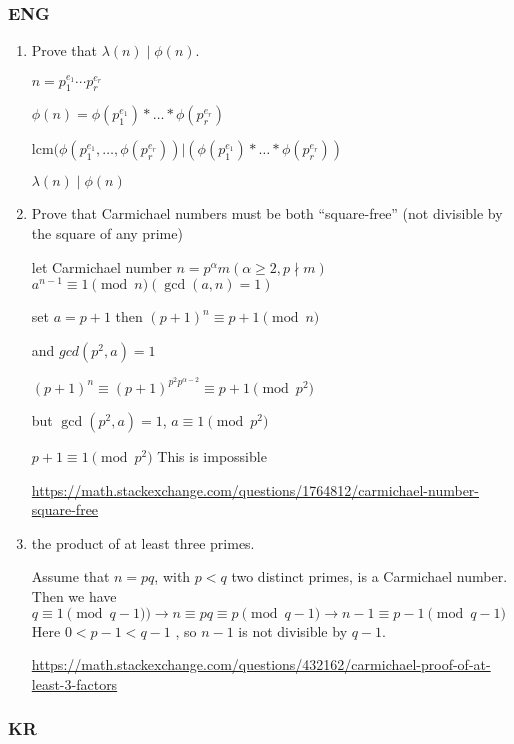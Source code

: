 \subsubsection{ENG}

\begin{enumerate}
    \item  Prove that $\lambda(n) \mid \phi(n)$.
    
    $n = p_1^{e_1} \cdots p_r^{e_r}$

    $ \phi(n) = \phi(p_1^{e_1})* \ldots*\phi(p_r^{e_r})$

    $\text{lcm}(\phi(p_1^{e_1}, \ldots, \phi(p_r^{e_r})) | (\phi(p_1^{e_1})* \ldots*\phi(p_r^{e_r}))$
    
    $\lambda(n) \mid \phi(n)$

    \item  Prove that Carmichael numbers must be both “square-free” (not divisible by the square of any prime) 

    let Carmichael number $n = p^\alpha m( \alpha \ge 2 ,  p \nmid m )$
    $a^{n-1} \equiv 1 \pmod{n} (\gcd(a,n) = 1)$
    
    set $a = p+1 $ then $(p+1)^{n} \equiv p+1 \pmod{n}$
    
    and $gcd(p^2,a) = 1$
    
    $(p+1)^{n} \equiv (p+1)^{p^2 p^{\alpha-2}} \equiv p+1 \pmod{p^2}$
    
    but $\gcd(p^2,a) = 1$,  $ a \equiv 1 \pmod{p^2}$
    
    $p+1 \equiv 1 \pmod{p^2}$ This is impossible
    
    \url{https://math.stackexchange.com/questions/1764812/carmichael-number-square-free}


    
    \item  the product of at least three primes. 
    
    Assume that $n=pq$, with $p<q$ two distinct primes, is a Carmichael number. 
    Then we have 
    $q≡1 \pmod{q−1} )\rightarrow n \equiv pq \equiv p \pmod{q−1}  \rightarrow n−1 \equiv p−1 \pmod{q−1}$
    Here $0 < p−1 < q−1$ , so $n−1$ is not divisible by $q−1$.

    
\url{https://math.stackexchange.com/questions/432162/carmichael-proof-of-at-least-3-factors}

\end{enumerate}



\subsubsection{KR}

